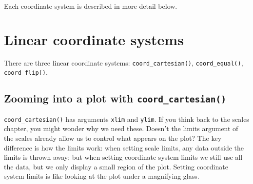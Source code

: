 Each coordinate system is described in more detail below.

\section{Linear coordinate systems}\label{sub:cartesian}

There are three linear coordinate systems: \texttt{coord\_cartesian()},
\texttt{coord\_equal()}, \texttt{coord\_flip()}.
 

\subsection{\texorpdfstring{Zooming into a plot with
\texttt{coord\_cartesian()}}{Zooming into a plot with coord\_cartesian()}}

\texttt{coord\_cartesian()} has arguments \texttt{xlim} and
\texttt{ylim}. If you think back to the scales chapter, you might wonder
why we need these. Doesn't the limits argument of the scales already
allow us to control what appears on the plot? The key difference is how
the limits work: when setting scale limits, any data outside the limits
is thrown away; but when setting coordinate system limits we still use
all the data, but we only display a small region of the plot. Setting
coordinate system limits is like looking at the plot under a magnifying
glass. 

\begin{Shaded}
\begin{Highlighting}[]
\StringTok{ }\StringTok{ }
\StringTok{  }\NormalTok{() +}\StringTok{ }
\StringTok{  }\NormalTok{()}

\StringTok{ }\NormalTok{(} \NormalTok{(}\NormalTok{, }\NormalTok{))}
\StringTok{ }\NormalTok{(} \NormalTok{(}\NormalTok{, }\NormalTok{))}
\end{Highlighting}
\end{Shaded}

